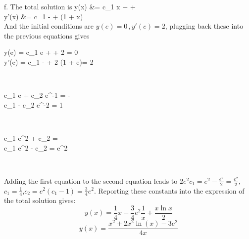 \documentclass[12pt,twoside]{article}
\begin{document}
\item [f.]
The total solution is
\ba
	y(x) 	&= c_1 x +  +  \\
	y'(x) 	&= c_1 -  +  (1 + \ln x) \\
\ea
And the initial conditions are $y(e) = 0 \, , y'(e) = 2$, plugging back these into the previous equations gives 
\ba
	\begin{cases}
	y(e) = c_1 e +  +  {2} = 0 \\
	y'(e) = c_1 -  +  {2} (1 +  \ln e)= 2 \\
	\end{cases} \\	
\ea
\ba
	\Rightarrow 
	\begin{cases}
	c_1 e + c_2 e^{-1}  = -  \\
	c_1 - c_2 e^{-2} = 1 \\
	\end{cases} \\	
\ea
\ba
	\Rightarrow 
	\begin{cases}
	c_1 e^2 + c_2  = -  \\
	c_1 e^2 - c_2  = e^2 \\
	\end{cases} \\	
\ea

Adding the first equation to the second equation leads to $2 e^2 c_1 = e^2 - \frac{e^2}{2} =  \frac{e^2}{2}$,  $c_1=\frac{1}{4}$,$c_2 = e^2 (c_1-1) = \frac{3}{4} e^2$. 
Reporting these constants into the expression of the total solution gives:
\[
	y(x) = \frac{1}{4} x -  \frac{3}{4} e^2 \frac{1}{x} + \frac{x \ln x}{2} 
\]
\[
	y(x) = \frac{x^2 + 2 x^2 \ln(x) - 3 e^2} { 4 x} 
\]

\ee
\end{document}
